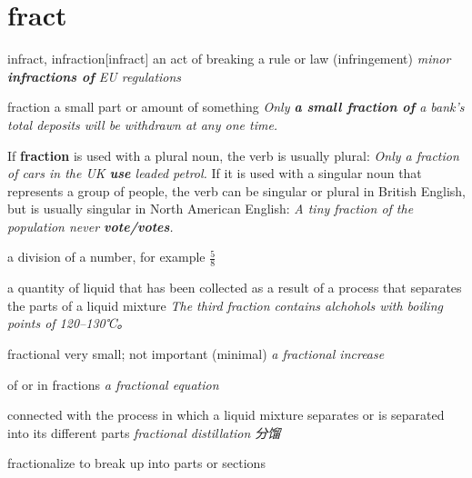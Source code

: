 \section{fract}

\begin{DefWord}{infract, infraction}[infract]
    an act of breaking a rule or law (infringement)
    \textit{minor \textbf{infractions of} EU regulations}
\end{DefWord}

\begin{DefWord}{fraction}
    a small part or amount of something
    \textit{Only \textbf{a small fraction of} a bank's total deposits will be withdrawn at any one time.}

    \begin{remark}
        If \textbf{fraction} is used with a plural noun, the verb is usually plural: \textit{Only a fraction of cars in the UK \textbf{use} leaded petrol.} If it is used with a singular noun that represents a group of people, the verb can be singular or plural in British English, but is usually singular in North American English: \textit{A tiny fraction of the population never \textbf{vote/votes}.}
    \end{remark}

    a division of a number, for example $\frac{5}{8}$

    a quantity of liquid that has been collected as a result of a process that separates the parts of a liquid mixture
    \textit{The third fraction contains alchohols with boiling points of 120–130℃。}
\end{DefWord}



\begin{DefWord}{fractional}
    very small; not important (minimal)
    \textit{a fractional increase}

    of or in fractions
    \textit{a fractional equation}

    connected with the process in which a liquid mixture separates or is separated into its different parts
    \textit{fractional distillation 分馏}

\end{DefWord}

\begin{DefWord}{fractionalize}
    to break up into parts or sections
\end{DefWord}


